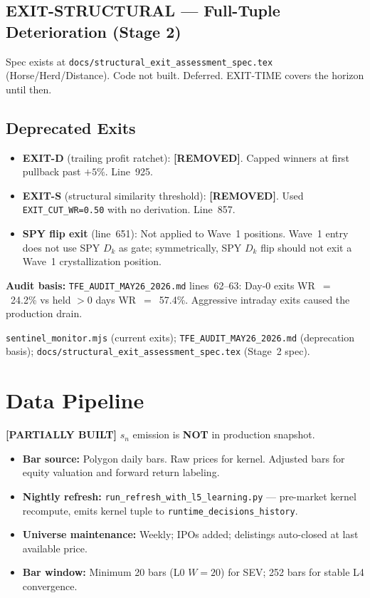 \documentclass[11pt,a4paper]{article}
\newcommand{\statuspartial}{\textcolor{statuspartial}{\textbf{[PARTIALLY BUILT]}}}
\newcommand{\statusremoved}{\textcolor{statusnotbuilt}{\textbf{[REMOVED]}}}
\newcommand{\code}[1]{\texttt{\small#1}}
\begin{document}
\subsection{EXIT-STRUCTURAL — Full-Tuple Deterioration (Stage 2)}

Spec exists at \texttt{docs/structural\_exit\_assessment\_spec.tex} (Horse/Herd/Distance). Code not built. Deferred. EXIT-TIME covers the horizon until then.

\subsection{Deprecated Exits}

\begin{itemize}
  \item \textbf{EXIT-D} (trailing profit ratchet): \statusremoved. Capped winners at first pullback past $+5\%$. Line~925.
  \item \textbf{EXIT-S} (structural similarity threshold): \statusremoved. Used \code{EXIT\_CUT\_WR=0.50} with no derivation. Line~857.
  \item \textbf{SPY flip exit} (line~651): Not applied to Wave~1 positions. Wave~1 entry does not use SPY $D_k$ as gate; symmetrically, SPY $D_k$ flip should not exit a Wave~1 crystallization position.
\end{itemize}

\textbf{Audit basis:} \texttt{TFE\_AUDIT\_MAY26\_2026.md} lines~62--63: Day-0 exits WR~$=$~24.2\% vs held $>$0 days WR~$=$~57.4\%. Aggressive intraday exits caused the production drain.

\begin{sourcebox}
\texttt{sentinel\_monitor.mjs} (current exits); \texttt{TFE\_AUDIT\_MAY26\_2026.md} (deprecation basis); \texttt{docs/structural\_exit\_assessment\_spec.tex} (Stage~2 spec).
\end{sourcebox}

\section{Data Pipeline}

\statuspartial{} $s_n$ emission is \textbf{NOT} in production snapshot.

\begin{itemize}
  \item \textbf{Bar source:} Polygon daily bars. Raw prices for kernel. Adjusted bars for equity valuation and forward return labeling.
  \item \textbf{Nightly refresh:} \texttt{run\_refresh\_with\_l5\_learning.py} — pre-market kernel recompute, emits kernel tuple to \texttt{runtime\_decisions\_history}.
  \item \textbf{Universe maintenance:} Weekly; IPOs added; delistings auto-closed at last available price.
  \item \textbf{Bar window:} Minimum 20 bars (L0 $W=20$) for SEV; 252 bars for stable L4 convergence.
\end{itemize}
\end{document}
